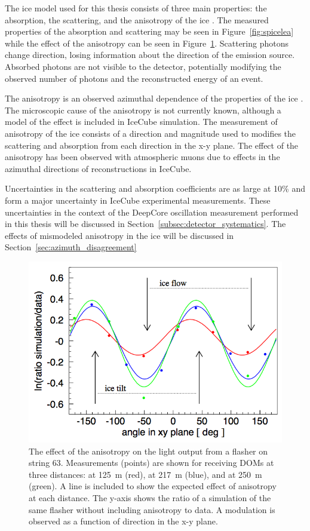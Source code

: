 The ice model used for this thesis consists of three main properties: the absorption, the scattering, and the anisotropy of the ice \cite{IceCube-SpiceLea}.
The measured properties of the absorption and scattering may be seen in Figure~\ref{fig:spicelea} while the effect of the anisotropy can be seen in Figure~\ref{fig:anisotropy}.
Scattering photons change direction, losing information about the direction of the emission source.
Absorbed photons are not visible to the detector, potentially modifying the observed number of photons and the reconstructed energy of an event.

The anisotropy is an observed azimuthal dependence of the properties of the ice \cite{IceCube-SpiceLea}.
The microscopic cause of the anisotropy is not currently known, although a model of the effect is included in IceCube simulation.
The measurement of anisotropy of the ice consists of a direction and magnitude used to modifies the scattering and absorption from each direction in the x-y plane.
The effect of the anisotropy has been observed with atmospheric muons due to effects in the azimuthal directions of reconstructions in IceCube.

Uncertainties in the scattering and absorption coefficients are as large at 10\% and form a major uncertainty in IceCube experimental measurements.
These uncertainties in the context of the DeepCore oscillation measurement performed in this thesis will be discussed in Section~\ref{subsec:detector_systematics}.
The effects of mismodeled anisotropy in the ice will be discussed in Section~\ref{sec:azimuth_disagreement}

\begin{figure}[h]
\centering
\includegraphics[width=0.6\linewidth]{anisotropy.png}
\caption[The measurement of anisotropy in the ice]{The effect of the anisotropy on the light output from a flasher on string 63. Measurements (points) are shown for receiving DOMs at three distances: at 125~m (red), at 217~m (blue), and at 250~m (green). A line is included to show the expected effect of anisotropy at each distance. The y-axis shows the ratio of a simulation of the same flasher without including anisotropy to data. A modulation is observed as a function of direction in the x-y plane.}
\label{fig:anisotropy}
\end{figure}



